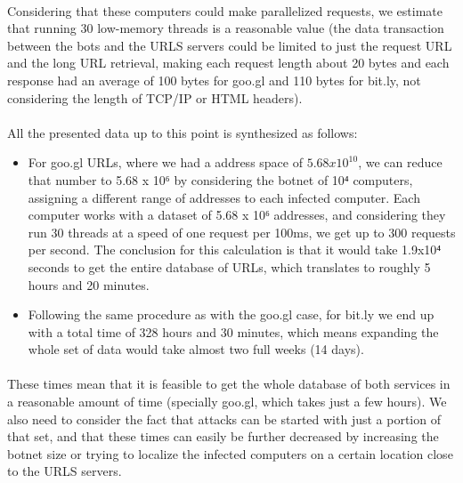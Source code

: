 \documentclass[12pt]{article}
\begin{document}
\paragraph{}
Considering that these computers could make parallelized requests, we estimate that running 30 low-memory threads is a reasonable value (the data transaction between the bots and the URLS servers could be limited to just the request URL and the long URL retrieval, making each request length about 20 bytes and each response had an average of 100 bytes for goo.gl and 110 bytes for bit.ly, not considering the length of TCP/IP or HTML headers).

\paragraph{}
All the presented data up to this point is synthesized as follows:

\begin{itemize}

\item  For goo.gl URLs, where we had a address space of $5.68 x 10^{10}$, we can reduce that number to 5.68 x 10⁶ by considering the botnet of 10⁴ computers, assigning a different range of addresses to each infected computer. Each computer works with a dataset of 5.68 x 10⁶ addresses, and considering they run 30 threads at a speed of one request per 100ms, we get up to 300 requests per second. The conclusion for this calculation is that it would take 1.9x10⁴ seconds to get the entire database of URLs, which translates to roughly 5 hours and 20 minutes.

\item  Following the same procedure as with the goo.gl case, for bit.ly we end up with a total time of 328 hours and 30 minutes, which means expanding the whole set of data would take almost two full weeks (14 days).

\end{itemize}

\paragraph{}
These times mean that it is feasible to get the whole database of both services in a reasonable amount of time (specially goo.gl, which takes just a few hours). We also need to consider the fact that attacks can be started with just a portion of that set, and that these times can easily be further decreased by increasing the botnet size or trying to localize the infected computers on a certain location close to the URLS servers.
\end{document}
